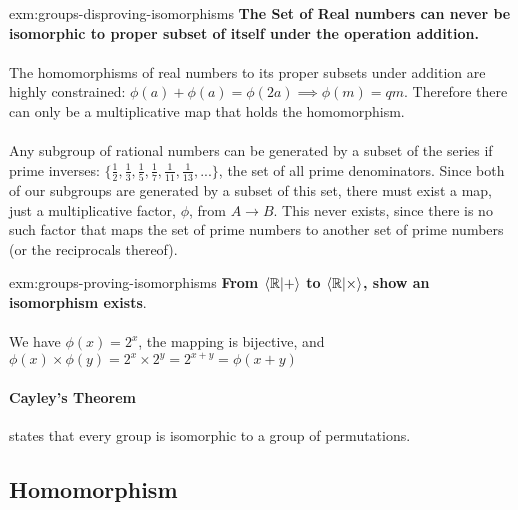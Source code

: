 \begin{example}{exm:groups-disproving-isomorphisms}
    \textbf{The Set of Real numbers can never be isomorphic to proper subset of itself under the operation addition.}
    \paragraph{} The homomorphisms of real numbers to its proper subsets under addition are highly constrained: $ \phi(a) + \phi(a) = \phi(2a) \implies \phi(m) = qm $. Therefore there can only be a multiplicative map that holds the homomorphism.
    \paragraph{} Any subgroup of rational numbers can be generated by a subset of the series if prime inverses: $\{\frac{1}{2},\frac{1}{3},\frac{1}{5},\frac{1}{7},\frac{1}{11},\frac{1}{13},...\}$, the set of all prime denominators. Since both of our subgroups are generated by a subset of this set, there must exist a map, just a multiplicative factor, $\phi$, from $A \rightarrow B$.
    This never exists, since there is no such factor that maps the set of prime numbers to another set of prime numbers (or the reciprocals thereof).
\end{example}

\vspace{10px}

\begin{example}{exm:groups-proving-isomorphisms}
    \textbf{From $\braket{\mathbb{R} | +}$ to $\braket{\mathbb{R} | \times}$, show an isomorphism exists}.
    \paragraph{} We have $\phi(x) = 2^x$, the mapping is bijective, and $\phi(x) \times \phi(y) = 2^x \times 2^y = 2^{x+y} = \phi(x+y)$
\end{example}

\paragraph{Cayley's Theorem} states that every group is isomorphic to a group of permutations.


\subsection{Homomorphism}

